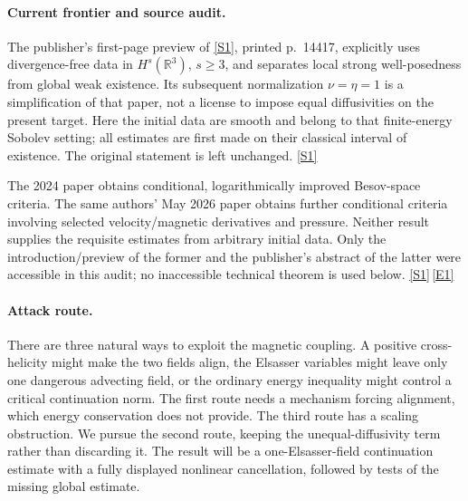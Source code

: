 \documentclass[11pt,a4paper]{article}
\newcommand{\R}{\mathbb{R}}
\newcommand{\sref}[2]{\hyperlink{source:#1:#2}{[S#2]}}
\newcommand{\eref}[2]{\hyperlink{extra:#1:#2}{[E#2]}}
\numberwithin{equation}{section}
\begin{document}
\paragraph{Current frontier and source audit.}
The publisher's first-page preview of \sref{109}{1}, printed p.~14417,
explicitly uses divergence-free data in $H^s(\R^3)$, $s\geq3$, and separates
local strong well-posedness from global weak existence. Its subsequent
normalization $\nu=\eta=1$ is a simplification of that paper, not a license
to impose equal diffusivities on the present target. Here the initial data
are smooth and belong to that finite-energy Sobolev setting; all estimates
are first made on their classical interval of existence. The original
statement is left unchanged. \sref{109}{1}

The 2024 paper obtains conditional, logarithmically improved Besov-space
criteria. The same authors' May 2026 paper obtains further conditional
criteria involving selected velocity/magnetic derivatives and pressure.
Neither result supplies the requisite estimates from arbitrary initial
data. Only the introduction/preview of the former and the publisher's
abstract of the latter were accessible in this audit; no inaccessible
technical theorem is used below. \sref{109}{1}\,\eref{109}{1}

\paragraph{Attack route.}
There are three natural ways to exploit the magnetic coupling. A positive
cross-helicity might make the two fields align, the Elsasser variables might
leave only one dangerous advecting field, or the ordinary energy inequality
might control a critical continuation norm. The first route needs a
mechanism forcing alignment, which energy conservation does not provide.
The third route has a scaling obstruction. We pursue the second route,
keeping the unequal-diffusivity term rather than discarding it. The result
will be a one-Elsasser-field continuation estimate with a fully displayed
nonlinear cancellation, followed by tests of the missing global estimate.
\end{document}
